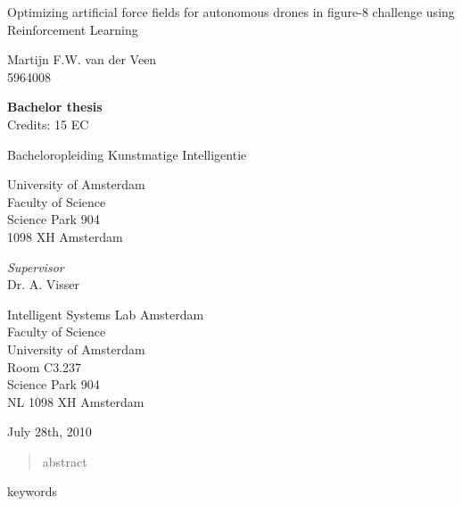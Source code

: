 \documentclass[11pt]{article}
\begin{document}

\begin{titlepage}
\begin{center}

\vspace{2.5cm}

\begin{huge}
Optimizing artificial force fields for autonomous drones in figure-8 challenge using Reinforcement Learning
\end{huge}

\vspace{1.5cm}
Martijn F.W. van der Veen\\
5964008

\vspace{1cm}
\textbf{Bachelor thesis}\\
Credits: 15 EC

\vspace{0.25cm}
Bacheloropleiding Kunstmatige Intelligentie

\vspace{0.25cm}
University of Amsterdam\\
Faculty of Science\\
Science Park 904\\
1098 XH Amsterdam

\vspace{2cm}
\emph{Supervisor}\\
Dr. A. Visser

\vspace{0.25cm}
Intelligent Systems Lab Amsterdam\\
Faculty of Science\\
University of Amsterdam\\
Room C3.237\\
Science Park 904\\
NL 1098 XH Amsterdam

\vspace{1.5cm}
July 28th, 2010

\end{center}
\end{titlepage}

\pagebreak



\pagestyle{empty} %
\begin{abstract}
abstract
\end{abstract}
keywords
\pagebreak

\end{document}
